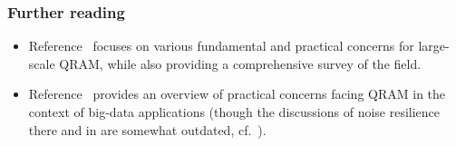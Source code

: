 \begin{refsection}

\subsubsection*{Further reading}

\begin{itemize}
    \item Reference~\cite{jaques2023qram} focuses on various fundamental and practical concerns for large-scale QRAM, while also providing a comprehensive survey of the field. 
    \item Reference~\cite{ciliberto2018QMLReview} provides an overview of practical concerns facing QRAM in the context of big-data applications (though the discussions of noise resilience there and in \cite{arunachalam2015RobustnessBuckBrigQRAM} are somewhat outdated, cf.~\cite{hann2021resilienceofQRAM}). 
\end{itemize}


\printbibliography[heading=secbib,segment=\therefsegment]


\end{refsection}


\newpage


